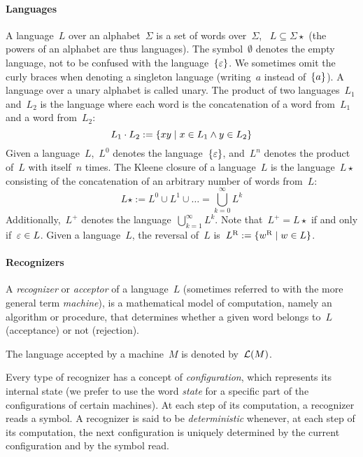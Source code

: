 \paragraph{Languages} A language~$L$ over an alphabet~$\Sigma$ is a set of words over~$\Sigma$, \ie~$L\subseteq\Sigma\star$ (the powers of an alphabet are thus languages).
The symbol~$\emptyset$ denotes the empty language, not to be confused with the language~$\{\varepsilon\}$.
We sometimes omit the curly braces when denoting a singleton language (writing~$a$ instead of~$\{a\}$).
A language over a unary alphabet is called unary.
The product of two languages~$L_1$ and~$L_2$ is the language where each word is the concatenation of a word from~$L_1$ and a word from~$L_2$: \begin{equation*} L_1\cdot L_2 := \{xy\mid x\in L_1 \land y\in L_2\} \end{equation*} Given a language~$L$,~$L^0$ denotes the language~$\{\varepsilon\}$, and~$L^n$ denotes the product of~$L$ with itself~$n$ times.
The Kleene closure of a language~$L$ is the language~$L\star$ consisting of the concatenation of an arbitrary number of words from~$L$: \begin{equation*} L\star := L^0\cup L^1\cup\dots=\bigcup_{k=0}^\infty L^k \end{equation*} Additionally,~$L^+$ denotes the language~$\bigcup_{k=1}^\infty L^k$.
Note that~$L^+=L\star$ if and only if~$\varepsilon\in L$.
Given a language~$L$, the reversal of~$L$ is~$L^{\mathrm R}:=\{w^{\mathrm R} \mid w\in L\}$.

\paragraph{Recognizers} A \emph{recognizer} or \emph{acceptor} of a language~$L$ (sometimes referred to with the more general term \emph{machine}), is a mathematical model of computation, namely an algorithm or procedure, that determines whether a given word belongs to~$L$ (acceptance) or not (rejection).

The language accepted by a machine~$M$ is denoted by~$\mathcal L(M)$.

Every type of recognizer has a concept of \emph{configuration}, which represents its internal state (we prefer to use the word \emph{state} for a specific part of the configurations of certain machines).
At each step of its computation, a recognizer reads a symbol.
A recognizer is said to be \emph{deterministic} whenever, at each step of its computation, the next configuration is uniquely determined by the current configuration and by the symbol read.



